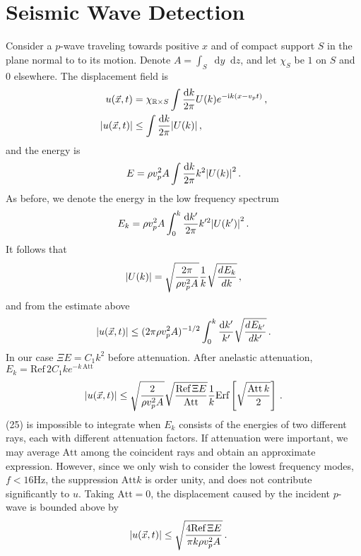 \documentclass[prd,reprint,10pt]{revtex4-1}
\newcommand*\diff{\mathop{}\!\mathrm{d}}
\newcommand*\R{\mathbb R}
\newcommand*\te[1]{\text{#1}}
\newcommand*\ps[1]{\left[#1\right]}
\newcommand*\f[2]{\frac{#1}{#2}}
\newcommand*\I{\te{i}}
\newcommand*\td[3]{\frac{d^{#3}#1}{d #2^{#3}}}
\begin{document}
\section{Seismic Wave Detection}
Consider a $p$-wave traveling towards positive $x$ and of compact support $S$ in the plane normal to to its motion. Denote $A =\int_S\diff y\diff z$, and let $\chi_S$ be $1$ on $S$ and $0$ elsewhere. The displacement field is
\begin{align}
u(\vec x,t) &= \chi_{\R\times S}\int\f{\diff k}{2\pi}U(k)e^{-\I k(x-v_p t)}\,,\\
\abs{u(\vec x,t)}&\leq\int\f{\diff k}{2\pi}\abs{U(k)}\,,
\end{align}
and the energy is
\begin{align}
E = \rho v_p^2 A\int\f{\diff k}{2\pi}k^2\abs{U(k)}^2\,.
\end{align}
As before, we denote the energy in the low frequency spectrum
\begin{align}
E_k = \rho v_p^2 A\int_0^k\f{\diff k'}{2\pi}k'^2\abs{U(k')}^2\,.
\end{align}
It follows that
\begin{align}
\abs{U(k)} = \sqrt{\f{2\pi}{\rho v_p^2 A}}\f1k\sqrt{\td{E_k}{k}{}}\,,
\end{align}
and from the estimate above
\begin{align}
\abs{u(\vec x,t)}\leq(2\pi\rho v_p^2 A)^{-1/2}\int_0^k\f{\diff k'}{k'}\sqrt{\td{E_{k'}}{k'}{}}\,.
\end{align}
In our case $\Xi E= C_1 k^2$ before attenuation. After anelastic attenuation, $E_k =\te{Ref}\,2C_1 k e^{-k\,\te{Att}}$
\begin{align}
\abs{u(\vec x,t)}\leq\sqrt{\f{2}{\rho v_p^2 A}}\sqrt{\f{\te{Ref}\,\Xi E}{\te{Att}}}\f1k\te{Erf}\ps{\sqrt{\f{\te{Att}\,k}{2}}}\,.
\end{align}
(25) is impossible to integrate when $E_k$ consists of the energies of two different rays, each with different attenuation factors. If attenuation were important, we may average $\te{Att}$ among the coincident rays and obtain an approximate expression. However, since we only wish to consider the lowest frequency modes, $f<16\te{Hz}$, the suppression $\te{Att} k$ is order unity, and does not contribute significantly to $u$. Taking $\te{Att} = 0$, the displacement caused by the incident $p$-wave is bounded above by
\begin{align}
\abs{u(\vec x,t)}&\leq\sqrt{\f{4\te{Ref}\,\Xi E}{\pi k\rho v_p^2 A}}\,.
\end{align}
\end{document}
